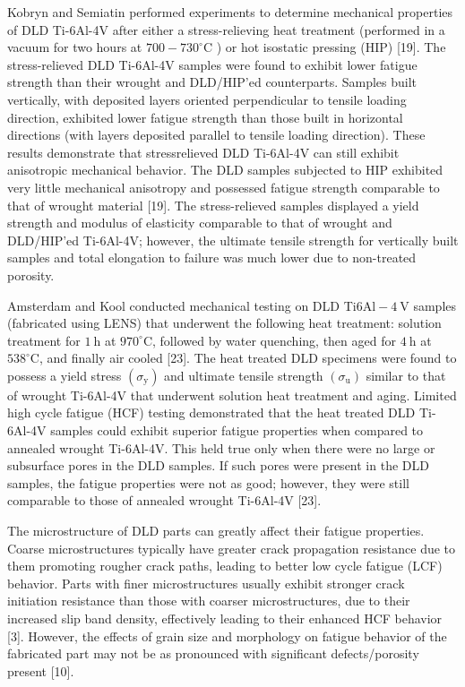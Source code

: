 \documentclass[10pt]{article}
\begin{document}
Kobryn and Semiatin performed experiments to determine mechanical properties of DLD Ti-6Al-4V after either a stress-relieving heat treatment (performed in a vacuum for two hours at $700-730^{\circ} \mathrm{C}$ ) or hot isostatic pressing (HIP) [19]. The stress-relieved DLD Ti-6Al-4V samples were found to exhibit lower fatigue strength than their wrought and DLD/HIP'ed counterparts. Samples built vertically, with deposited layers oriented perpendicular to tensile loading direction, exhibited lower fatigue strength than those built in horizontal directions (with layers deposited parallel to tensile loading direction). These results demonstrate that stressrelieved DLD Ti-6Al-4V can still exhibit anisotropic mechanical behavior. The DLD samples subjected to HIP exhibited very little mechanical anisotropy and possessed fatigue strength comparable to that of wrought material [19]. The stress-relieved samples displayed a yield strength and modulus of elasticity comparable to that of wrought and DLD/HIP'ed Ti-6Al-4V; however, the ultimate tensile strength for vertically built samples and total elongation to failure was much lower due to non-treated porosity.

Amsterdam and Kool conducted mechanical testing on DLD Ti$6 \mathrm{Al}-4 \mathrm{~V}$ samples (fabricated using LENS) that underwent the following heat treatment: solution treatment for $1 \mathrm{~h}$ at $970^{\circ} \mathrm{C}$, followed by water quenching, then aged for $4 \mathrm{~h}$ at $538^{\circ} \mathrm{C}$, and finally air cooled [23]. The heat treated DLD specimens were found to possess a yield stress $\left(\sigma_{\mathrm{y}}\right)$ and ultimate tensile strength $\left(\sigma_{\mathrm{u}}\right)$ similar to that of wrought Ti-6Al-4V that underwent solution heat treatment and aging. Limited high cycle fatigue (HCF) testing demonstrated that the heat treated DLD Ti-6Al-4V samples could exhibit superior fatigue properties when compared to annealed wrought Ti-6Al-4V. This held true only when there were no large or subsurface pores in the DLD samples. If such pores were present in the DLD samples, the fatigue properties were not as good; however, they were still comparable to those of annealed wrought Ti-6Al-4V [23].

The microstructure of DLD parts can greatly affect their fatigue properties. Coarse microstructures typically have greater crack propagation resistance due to them promoting rougher crack paths, leading to better low cycle fatigue (LCF) behavior. Parts with finer microstructures usually exhibit stronger crack initiation resistance than those with coarser microstructures, due to their increased slip band density, effectively leading to their enhanced HCF behavior [3]. However, the effects of grain size and morphology on fatigue behavior of the fabricated part may not be as pronounced with significant defects/porosity present [10].
\end{document}
